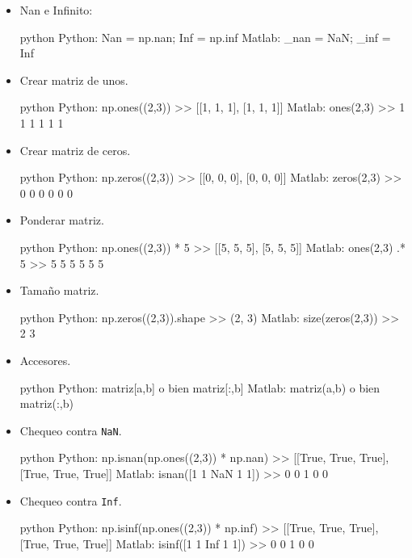 \documentclass[letterpaper,11pt]{article} %
\begin{document}
\begin{itemize}
	
	\item{
		Nan e Infinito:
		\begin{sourcecode}{python}{}
Python: Nan = np.nan; Inf = np.inf
Matlab: _nan = NaN; _inf = Inf
\end{sourcecode}
	}
	
	\item{
		Crear matriz de unos.
		\begin{sourcecode}{python}{}
Python: np.ones((2,3))
>>	[[1, 1, 1],
[1, 1, 1]]
Matlab: ones(2,3)
>>	1 1 1
1 1 1
\end{sourcecode}
	}
	
	\newpage
	\item{
		Crear matriz de ceros.
		\begin{sourcecode}{python}{}
Python: np.zeros((2,3))
>>	[[0, 0, 0],
[0, 0, 0]]
Matlab: zeros(2,3)
>>	0 0 0
0 0 0
\end{sourcecode}
	}
	
	\item{
		Ponderar matriz.
		\begin{sourcecode}{python}{}
Python: np.ones((2,3)) * 5
>>	[[5, 5, 5],
[5, 5, 5]]
Matlab: ones(2,3) .* 5
>>	5 5 5
5 5 5
\end{sourcecode}
	}
	
	\item{
		Tamaño matriz.
		\begin{sourcecode}{python}{}
Python: np.zeros((2,3)).shape
>>	(2, 3)
Matlab: size(zeros(2,3))
>>	2 3
\end{sourcecode}
	}
	
	\item{
		Accesores.
		\begin{sourcecode}{python}{}
Python: matriz[a,b] o bien matriz[:,b]
Matlab: matriz(a,b) o bien matriz(:,b)
\end{sourcecode}
	}
	
	\item{
		Chequeo contra \texttt{NaN}.
		\begin{sourcecode}{python}{}
Python: np.isnan(np.ones((2,3)) * np.nan)
>>	[[True, True, True],
[True, True, True]]
Matlab: isnan([1 1 NaN 1 1])
>>	0 0 1 0 0
\end{sourcecode}
	}
	
	\item{
		Chequeo contra \texttt{Inf}.
		\begin{sourcecode}{python}{}
Python: np.isinf(np.ones((2,3)) * np.inf)
>>	[[True, True, True],
[True, True, True]]
Matlab: isinf([1 1 Inf 1 1])
>>	0 0 1 0 0
\end{sourcecode}
	}
	

\end{itemize}
\end{document}
